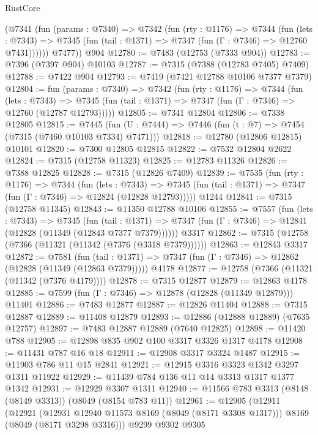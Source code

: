 \begin{lexlean}{RustCore}
\begin{coremodule}
        (@7341
          (fun (params : @7340) =>
          @7342
            (fun (rty : @1176) =>
            @7344
              (fun (lets : @7343) =>
              @7345 (fun (tail : @1371) => @7347 (fun (Γ : @7346) => @12760 @7431))))))
        @7477))
    @904
@12780 := @7483 (@12753 (@7333 @904))
@12783 := @7396 (@7397 @904) @10103
@12787 := @7315 (@7388 (@12783 @7405) @7409)
@12788 := @7422 @904
@12793 := @7419 (@7421 @12788 @10106 @7377 @7379)
@12804 := fun (params : @7340) =>
  @7342
    (fun (rty : @1176) =>
    @7344
      (fun (lets : @7343) =>
      @7345 (fun (tail : @1371) => @7347 (fun (Γ : @7346) => @12760 (@12787 @12793)))))
@12805 := @7341 @12804
@12806 := @7338 @12805
@12815 := @7445
    (fun (U : @7444) => @7446 (fun (t : @7) => @7454 (@7315 (@7460 @10103 @7334) @7471)))
@12818 := @12780 (@12806 @12815) @10101
@12820 := @7300 @12805 @12815
@12822 := @7532 @12804 @2622
@12824 := @7315 (@12758 @11323)
@12825 := @12783 @11326
@12826 := @7388 @12825
@12828 := @7315 (@12826 @7409)
@12839 := @7535
    (fun (rty : @1176) =>
    @7344
      (fun (lets : @7343) =>
      @7345 (fun (tail : @1371) => @7347 (fun (Γ : @7346) => @12824 (@12828 @12793)))))
    @1244
@12841 := @7315 (@12758 @11345)
@12843 := @11350 @12788 @10106
@12855 := @7557
    (fun (lets : @7343) =>
    @7345
      (fun (tail : @1371) =>
      @7347 (fun (Γ : @7346) => @12841 (@12828 (@11349 (@12843 @7377 @7379))))))
    @3317
@12862 := @7315 (@12758 (@7366 (@11321 (@11342 (@7376 (@3318 @7379))))))
@12863 := @12843 @3317
@12872 := @7581
    (fun (tail : @1371) => @7347 (fun (Γ : @7346) => @12862 (@12828 (@11349 (@12863 @7379)))))
    @4178
@12877 := @12758 (@7366 (@11321 (@11342 (@7376 @4179))))
@12878 := @7315 @12877
@12879 := @12863 @4178
@12885 := @7599 (fun (Γ : @7346) => @12878 (@12828 (@11349 @12879))) @11401
@12886 := @7483 @12877
@12887 := @12826 @11404
@12888 := @7315 @12887
@12889 := @11408 @12879
@12893 := @12886 (@12888 @12889) (@7635 @12757)
@12897 := @7483 @12887 @12889 (@7640 @12825)
@12898 := @11420 @788
@12905 := @12898 @835 @902 @100 @3317 @3326 @1317 @4178
@12908 := @11431 @787 @16 @18
@12911 := @12908 @3317 @3324 @1487
@12915 := @11903 @786 @11 @15 @2841
@12921 := @12915 @3316 @3323 @1342 @3297 @1311 @11922
@12929 := @11439 @784 @136 @11 @14 @3313 @1317 @1377 @1342
@12931 := @12929 @3307 @1311
@12940 := @11566 @783 @3313 (@8148 (@8149 @3313)) (@8049 (@8154 @783 @11))
@12961 := @12905
    (@12911
      (@12921
        (@12931 @12940 @11573 @8169 (@8049 (@8171 @3308 @1317)))
        @8169
        (@8049 (@8171 @3298 @3316)))
      @9299
      @9302
      @9305

\end{coremodule}
\end{lexlean}
